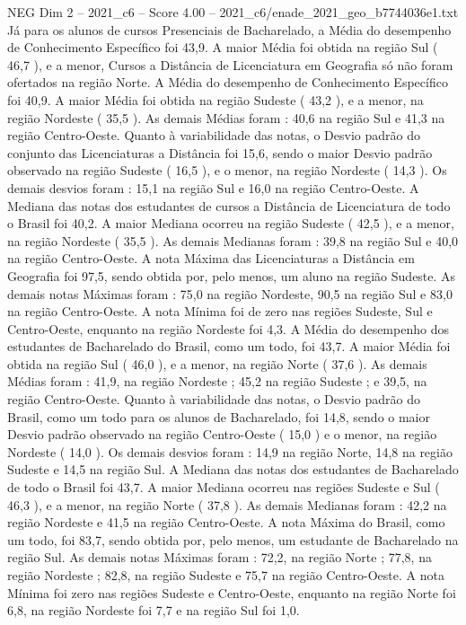 \begin{textsample}{NEG Dim 2 – 2021\_c6 – Score 4.00 – 2021\_c6/enade\_2021\_geo\_b7744036e1.txt}
Já para os alunos de cursos Presenciais de Bacharelado, a Média do desempenho de Conhecimento Específico foi 43,9.
A maior Média foi obtida na região Sul ( 46,7 ), e a menor, Cursos a Distância de Licenciatura em Geografia só não foram ofertados na região Norte.
A Média do desempenho de Conhecimento Específico foi 40,9.
A maior Média foi obtida na região Sudeste ( 43,2 ), e a menor, na região Nordeste ( 35,5 ).
As demais Médias foram : 40,6 na região Sul e 41,3 na região Centro-Oeste.
Quanto à variabilidade das notas, o Desvio padrão do conjunto das Licenciaturas a Distância foi 15,6, sendo o maior Desvio padrão observado na região Sudeste ( 16,5 ), e o menor, na região Nordeste ( 14,3 ).
Os demais desvios foram : 15,1 na região Sul e 16,0 na região Centro-Oeste.
A Mediana das notas dos estudantes de cursos a Distância de Licenciatura de todo o Brasil foi 40,2.
A maior Mediana ocorreu na região Sudeste ( 42,5 ), e a menor, na região Nordeste ( 35,5 ).
As demais Medianas foram : 39,8 na região Sul e 40,0 na região Centro-Oeste.
A nota Máxima das Licenciaturas a Distância em Geografia foi 97,5, sendo obtida por, pelo menos, um aluno na região Sudeste.
As demais notas Máximas foram : 75,0 na região Nordeste, 90,5 na região Sul e 83,0 na região Centro-Oeste.
A nota Mínima foi de zero nas regiões Sudeste, Sul e Centro-Oeste, enquanto na região Nordeste foi 4,3.
A Média do desempenho dos estudantes de Bacharelado do Brasil, como um todo, foi 43,7.
A maior Média foi obtida na região Sul ( 46,0 ), e a menor, na região Norte ( 37,6 ).
As demais Médias foram : 41,9, na região Nordeste ; 45,2 na região Sudeste ; e 39,5, na região Centro-Oeste.
Quanto à variabilidade das notas, o Desvio padrão do Brasil, como um todo para os alunos de Bacharelado, foi 14,8, sendo o maior Desvio padrão observado na região Centro-Oeste ( 15,0 ) e o menor, na região Nordeste ( 14,0 ).
Os demais desvios foram : 14,9 na região Norte, 14,8 na região Sudeste e 14,5 na região Sul.
A Mediana das notas dos estudantes de Bacharelado de todo o Brasil foi 43,7.
A maior Mediana ocorreu nas regiões Sudeste e Sul ( 46,3 ), e a menor, na região Norte ( 37,8 ).
As demais Medianas foram : 42,2 na região Nordeste e 41,5 na região Centro-Oeste.
A nota Máxima do Brasil, como um todo, foi 83,7, sendo obtida por, pelo menos, um estudante de Bacharelado na região Sul.
As demais notas Máximas foram : 72,2, na região Norte ; 77,8, na região Nordeste ; 82,8, na região Sudeste e 75,7 na região Centro-Oeste.
A nota Mínima foi zero nas regiões Sudeste e Centro-Oeste, enquanto na região Norte foi 6,8, na região Nordeste foi 7,7 e na região Sul foi 1,0.

\end{textsample}
